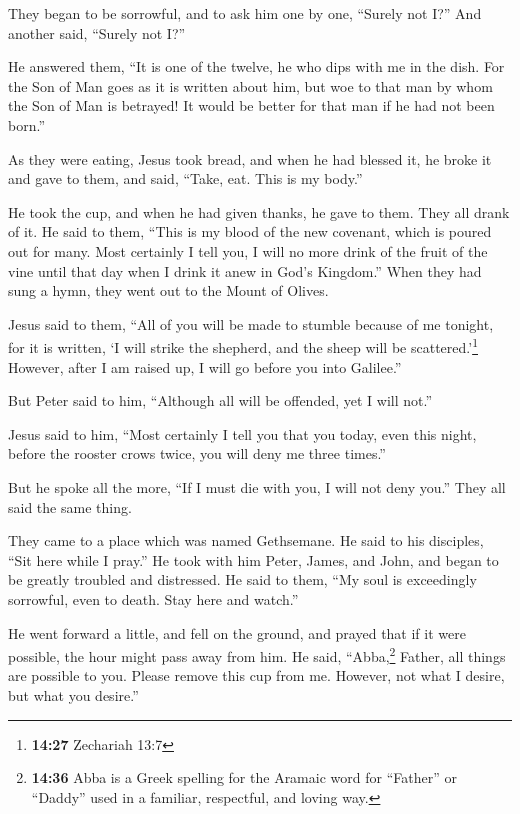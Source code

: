  They began to be sorrowful, and to ask him one by one,
``Surely not I?'' And another said, ``Surely not I?''

 He answered them, ``It is one of the twelve, he who dips
with me in the dish.  For the Son of Man goes as it is
written about him, but woe to that man by whom the Son of Man is
betrayed! It would be better for that man if he had not been born.''

 As they were eating, Jesus took bread, and when he had
blessed it, he broke it and gave to them, and said, ``Take, eat. This is
my body.''

 He took the cup, and when he had given thanks, he gave
to them. They all drank of it.  He said to them, ``This
is my blood of the new covenant, which is poured out for many.
 Most certainly I tell you, I will no more drink of the
fruit of the vine until that day when I drink it anew in God's
Kingdom.''  When they had sung a hymn, they went out to
the Mount of Olives.

 Jesus said to them, ``All of you will be made to stumble
because of me tonight, for it is written, `I will strike the shepherd,
and the sheep will be scattered.'\footnote{\textbf{14:27} Zechariah 13:7}
 However, after I am raised up, I will go before you into
Galilee.''

 But Peter said to him, ``Although all will be offended,
yet I will not.''

 Jesus said to him, ``Most certainly I tell you that you
today, even this night, before the rooster crows twice, you will deny me
three times.''

 But he spoke all the more, ``If I must die with you, I
will not deny you.'' They all said the same thing.

 They came to a place which was named Gethsemane. He said
to his disciples, ``Sit here while I pray.''  He took
with him Peter, James, and John, and began to be greatly troubled and
distressed.  He said to them, ``My soul is exceedingly
sorrowful, even to death. Stay here and watch.''

 He went forward a little, and fell on the ground, and
prayed that if it were possible, the hour might pass away from him.
 He said, ``Abba,\footnote{\textbf{14:36} Abba is a Greek
  spelling for the Aramaic word for ``Father'' or ``Daddy'' used in a
  familiar, respectful, and loving way.} Father, all things are possible
to you. Please remove this cup from me. However, not what I desire, but
what you desire.''

